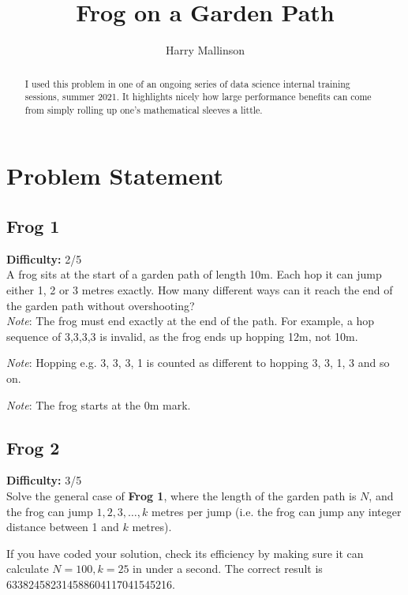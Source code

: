 \documentclass[hidelinks]{article}
\title{Frog on a Garden Path}
\author{Harry Mallinson}
\begin{document}
\maketitle


\begin{abstract}
I used this problem in one of an ongoing series of  data science internal training sessions, summer 2021. It highlights nicely how large performance benefits can come from simply rolling up one's mathematical sleeves a little.
\end{abstract}

\section{Problem Statement}
\subsection{Frog 1}

\textbf{Difficulty:} 2/5 \\

A frog sits at the start of a garden path of length 10m.  Each hop it can jump either 1, 2 or 3 metres exactly.  How many different ways can it reach the end of the garden path without overshooting?  
\\

\textit{Note}: The frog must end exactly at the end of the path. For example, a hop sequence of 3,3,3,3 is  invalid, as the frog ends up hopping 12m, not 10m.

\textit{Note}: Hopping e.g. 3, 3, 3, 1 is counted as different to hopping 3, 3, 1, 3 and so on.

\textit{Note}: The frog starts at the 0m mark.

\subsection{Frog 2}

\textbf{Difficulty:} 3/5\\

Solve the general case of \textbf{Frog 1}, where the length of the garden path is $N$, and the frog can jump $1, 2, 3, \dots, k$ metres per jump (i.e. the frog can jump any integer distance between 1 and $k$ metres).

If you have coded your solution, check its efficiency by making sure it can calculate $N=100, k=25$ in under a second. The correct result is 633824582314588604117041545216. \\
\end{document}
